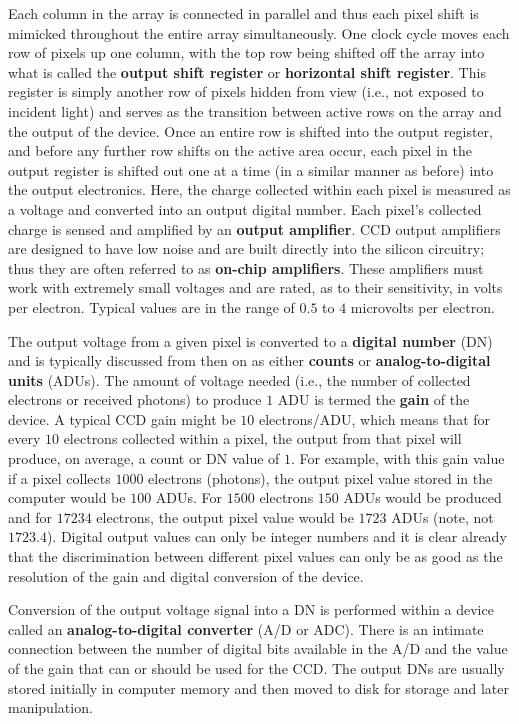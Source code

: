 \documentclass[a4paper,10pt]{article}
\begin{document}
{\noindent}Each column in the array is connected in parallel and thus each pixel shift is mimicked throughout the entire array simultaneously. One clock cycle moves each row of pixels up one column, with the top row being shifted off the array into what is called the \textbf{output shift register} or \textbf{horizontal shift register}. This register is simply another row of pixels hidden from view (i.e., not exposed to incident light) and serves as the transition between active rows on the array and the output of the device. Once an entire row is shifted into the output register, and before any further row shifts on the active area occur, each pixel in the output register is shifted out one at a time (in a similar manner as before) into the output electronics. Here, the charge collected within each pixel is measured as a voltage and converted into an output digital number. Each pixel's collected charge is sensed and amplified by an \textbf{output amplifier}. CCD output amplifiers are designed to have low noise and are built directly into the silicon circuitry; thus they are often referred to as \textbf{on-chip amplifiers}. These amplifiers must work with extremely small voltages and are rated, as to their sensitivity, in volts per electron. Typical values are in the range of $0.5$ to $4$ microvolts per electron.

{\noindent}The output voltage from a given pixel is converted to a \textbf{digital number} (DN) and is typically discussed from then on as either \textbf{counts} or \textbf{analog-to-digital units} (ADUs). The amount of voltage needed (i.e., the number of collected electrons or received photons) to produce $1$ ADU is termed the \textbf{gain} of the device. A typical CCD gain might be $10$ electrons/ADU, which means that for every $10$ electrons collected within a pixel, the output from that pixel will produce, on average, a count or DN value of $1$. For example, with this gain value if a pixel collects $1000$ electrons (photons), the output pixel value stored in the computer would be $100$ ADUs. For $1500$ electrons $150$ ADUs would be produced and for $17234$ electrons, the output pixel value would be $1723$ ADUs (note, not $1723.4$). Digital output values can only be integer numbers and it is clear already that the discrimination between different pixel values can only be as good as the resolution of the gain and digital conversion of the device.

{\noindent}Conversion of the output voltage signal into a DN is performed within a device called an \textbf{analog-to-digital converter} (A/D or ADC). There is an intimate connection between the number of digital bits available in the A/D and the value of the gain that can or should be used for the CCD. The output DNs are usually stored initially in computer memory and then moved to disk for storage and later manipulation.
\end{document}
